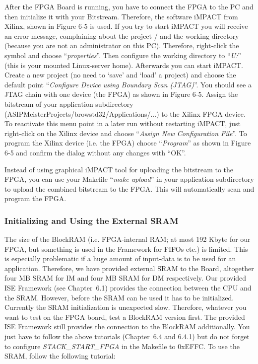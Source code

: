 \documentclass[
]{article}
\begin{document}
After the FPGA Board is running, you have to connect the FPGA to the PC
and then initialize it with your Bitstream. Therefore, the software
iMPACT from Xilinx, shown in Figure 6-5 is used. If you try to start
iMPACT you will receive an error message, complaining about the
project-/ and the working directory (because you are not an
administrator on this PC). Therefore, right-click the symbol and choose
``\emph{properties}''. Then configure the working directory to
``\emph{U:}'' (this is your mounted Linux-server home). Afterwards you
can start iMPACT. Create a new project (no need to `save' and `load' a
project) and choose the default point ``\emph{Configure Device using
Boundary Scan (JTAG)}''. You should see a JTAG chain with one device
(the FPGA) as shown in Figure 6-5. Assign the bitstream of your
application subdirectory
(ASIPMeisterProjects/browstd32/Applications/...) to the Xilinx FPGA
device. To reactivate this menu point in a later run without restarting
iMPACT, just right-click on the Xilinx device and choose ``\emph{Assign
New Configuration File}''. To program the Xilinx device (i.e. the FPGA)
choose ``\emph{Program}'' as shown in Figure 6-5 and confirm the dialog
without any changes with ``OK''.

Instead of using graphical iMPACT tool for uploading the bitstream to
the FPGA, you can use your Makefile ``\emph{make upload}'' in your
application subdirectory to upload the combined bitstream to the FPGA.
This will automatically scan and program the FPGA.

\hypertarget{initializing-and-using-the-external-sram}{%
\subsubsection{Initializing and Using the External
SRAM}\label{initializing-and-using-the-external-sram}}

The size of the BlockRAM (i.e. FPGA-internal RAM; at most 192 Kbyte for
our FPGA, but something is used in the Framework for FIFOs etc.) is
limited. This is especially problematic if a huge amount of input-data
is to be used for an application. Therefore, we have provided external
SRAM to the Board, altogether four MB SRAM for IM and four MB SRAM for
DM respectively. Our provided ISE Framework (see Chapter~6.1) provides
the connection between the CPU and the SRAM. However, before the SRAM
can be used it has to be initialized. Currently the SRAM initialization
is unexpected slow. Therefore, whatever you want to test on the FPGA
board, test a BlockRAM version first. The provided ISE Framework still
provides the connection to the BlockRAM additionally. You just have to
follow the above tutorials (Chapter~6.4 and 6.4.1) but do not forget to
configure \emph{STACK\_START\_FPGA} in the Makefile to 0xEFFC. To use
the SRAM, follow the following tutorial:
\end{document}
